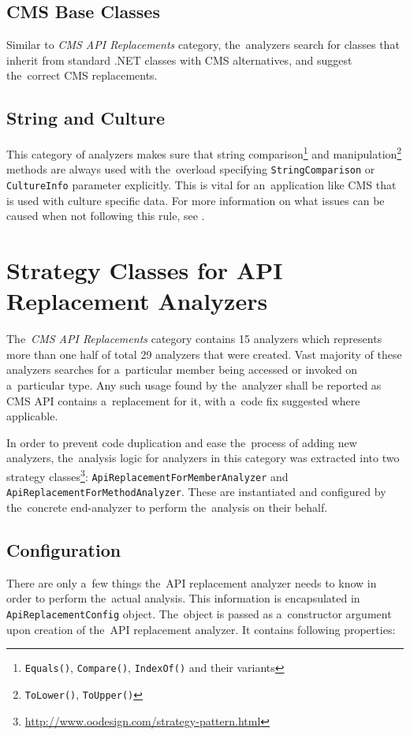 \documentclass[
  digital, %
  table,   %
  lof,     %
  lot,     %
  oneside,
]{fithesis3}
\begin{document}
\subsection{CMS Base Classes}
Similar to \textit{CMS API Replacements} category, the~analyzers search for classes that inherit from standard .NET classes with CMS alternatives, and suggest the~correct CMS replacements.

\subsection{String and Culture}
This category of analyzers makes sure that string comparison\footnote{\texttt{Equals()}, \texttt{Compare()}, \texttt{IndexOf()} and their variants} and manipulation\footnote{\texttt{ToLower()}, \texttt{ToUpper()}} methods are always used with the~overload specifying \texttt{StringComparison} or \texttt{CultureInfo} parameter explicitly. This is vital for an~application like CMS that is used with culture specific data. For more information on what issues can be caused when not following this rule, see \cite{best-practices-for-using-strings-in-dot-net}. 

\section{Strategy Classes for API Replacement Analyzers}
The~\textit{CMS API Replacements} category contains 15 analyzers which represents more than one half of total 29 analyzers that were created. Vast majority of these analyzers searches for a~particular member being accessed or invoked on a~particular type. Any such usage found by the~analyzer shall be reported as CMS API contains a~replacement for it, with a~code fix suggested where applicable.

In order to prevent code duplication and ease the~process of adding new analyzers, the~analysis logic for analyzers in this category was extracted into two strategy classes\footnote{\url{http://www.oodesign.com/strategy-pattern.html}}: \texttt{ApiReplacementForMemberAnalyzer} and \texttt{ApiReplacementForMethodAnalyzer}. These are instantiated and configured by the~concrete end-analyzer to perform the~analysis on their behalf.

\subsection{Configuration}
There are only a~few things the~API replacement analyzer needs to know in order to perform the~actual analysis. This information is encapsulated in \texttt{ApiReplacementConfig} object. The~object is passed as a~constructor argument upon creation of the~API replacement analyzer. It contains following properties:
\end{document}
